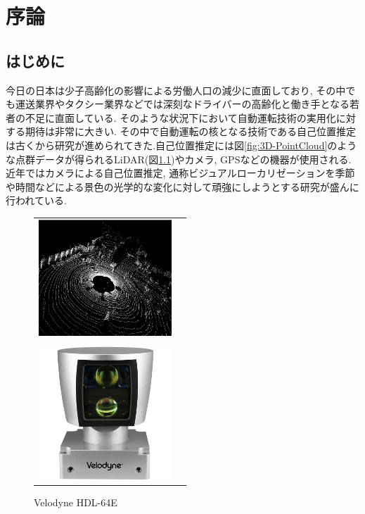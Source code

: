 \chapter{序論}
\section{はじめに}
 今日の日本は少子高齢化の影響による労働人口の減少に直面しており, その中でも運送業界やタクシー業界などでは深刻なドライバーの高齢化と働き手となる若者の不足に直面している. そのような状況下において自動運転技術の実用化に対する期待は非常に大きい. その中で自動運転の核となる技術である自己位置推定は古くから研究が進められてきた.自己位置推定には図\ref{fig:3D-PointCloud}のような点群データが得られるLiDAR(図\ref{fig:HDL-64E})やカメラ, GPSなどの機器が使用される. 近年ではカメラによる自己位置推定, 通称ビジュアルローカリゼーションを季節や時間などによる景色の光学的な変化に対して頑強にしようとする研究が盛んに行われている\cite{semantic_segmentation_in_snow}\cite{stenborg_2020}. 
\begin{figure}[htpb]
\begin{center}
\begin{tabular}{cc}
\begin{minipage}[t]{1.0\hsize}
\begin{center}
\includegraphics[width=5cm]{./picture/KITTI_pointcloud.png}
\caption{LiDARから得られた三次元点群}
\label{fig:3D-PointCloud}
\end{center}
\end{minipage} \\ \\
\begin{minipage}[t]{1.0\hsize}
\begin{center}
\includegraphics[width=5cm]{./picture/HDL64E.png}
\caption{Velodyne HDL-64E}
\label{fig:HDL-64E}
\end{center}
\end{minipage}
\end{tabular}
\end{center}
\end{figure}

